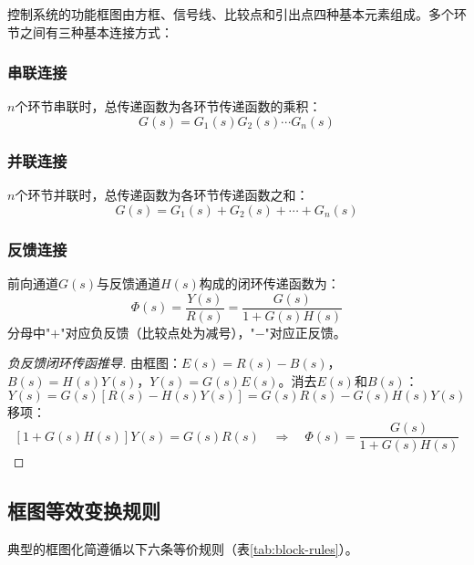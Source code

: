 控制系统的功能框图由方框、信号线、比较点和引出点四种基本元素组成。多个环节之间有三种基本连接方式：

\subsubsection*{串联连接}
$n$个环节串联时，总传递函数为各环节传递函数的乘积：
\[
G(s) = G_1(s)G_2(s)\cdots G_n(s)
\]

\subsubsection*{并联连接}
$n$个环节并联时，总传递函数为各环节传递函数之和：
\[
G(s) = G_1(s) + G_2(s) + \cdots + G_n(s)
\]

\subsubsection*{反馈连接}
前向通道$G(s)$与反馈通道$H(s)$构成的闭环传递函数为：
\[
\Phi(s) = \frac{Y(s)}{R(s)} = \frac{G(s)}{1 + G(s)H(s)}
\]
分母中"$+$"对应负反馈（比较点处为减号），"$-$"对应正反馈。

\begin{proof}[负反馈闭环传函推导]
由框图：$E(s) = R(s) - B(s)$，$B(s) = H(s)Y(s)$，$Y(s) = G(s)E(s)$。消去$E(s)$和$B(s)$：
\[
Y(s) = G(s)[R(s)-H(s)Y(s)] = G(s)R(s) - G(s)H(s)Y(s)
\]
移项：
\[
[1 + G(s)H(s)]Y(s) = G(s)R(s) \quad\Rightarrow\quad \Phi(s) = \frac{G(s)}{1+G(s)H(s)}
\]
\end{proof}

\subsection{框图等效变换规则}

典型的框图化简遵循以下六条等价规则（表\ref{tab:block-rules}）。

